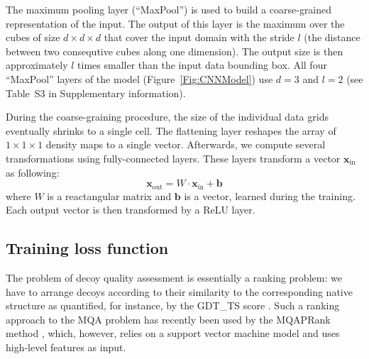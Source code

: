 \documentclass{bioinfo}
\begin{document}
The maximum pooling layer (``MaxPool'') is used to build a
coarse-grained representation of the input. The output of this layer
is the maximum over the cubes of size $d \times d \times d$ that cover
the input domain with the stride $l$ (the distance between two
consequtive cubes along one dimension).  The output size is then
approximately $l$ times smaller than the input data bounding box.  All
four ``MaxPool'' layers of the model (Figure~\ref{Fig:CNNModel}) use
$d=3$ and $l=2$ (see Table~S3 in Supplementary information).

During the coarse-graining procedure, the size of the individual data
grids eventually shrinks to a single cell. The flattening layer
reshapes the array of $1\times 1\times 1$ density maps to a single
vector. Afterwards, we compute several transformations using
fully-connected layers. These layers transform a vector
$\mathbf{x}_\text{in}$ as following:
\begin{equation}
\mathbf{x}_\text{out} = W \cdot \mathbf{x}_\text{in} + \mathbf{b}
\end{equation}
where $W$ is a reactangular matrix and $\mathbf{b}$ is a vector,
learned during the training. Each output vector is then transformed by
a ReLU layer.
%
%
\subsection{Training loss function}
%
%
The problem of decoy quality assessment is essentially a ranking
problem: we have to arrange decoys according to their similarity to
the corresponding native structure as quantified, for instance, by the GDT\_TS score
\citep{zemla2001casp4}. Such a ranking approach to the
MQA problem has recently been used by the
MQAPRank method \citep{jing2016sorting}, which, however, relies on a
support vector machine model and uses high-level features as
input.
\end{document}
